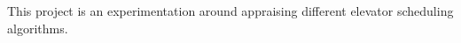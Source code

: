 \documentclass{article}
\begin{document}
This project is an experimentation around appraising different elevator scheduling algorithms.
\end{document}
